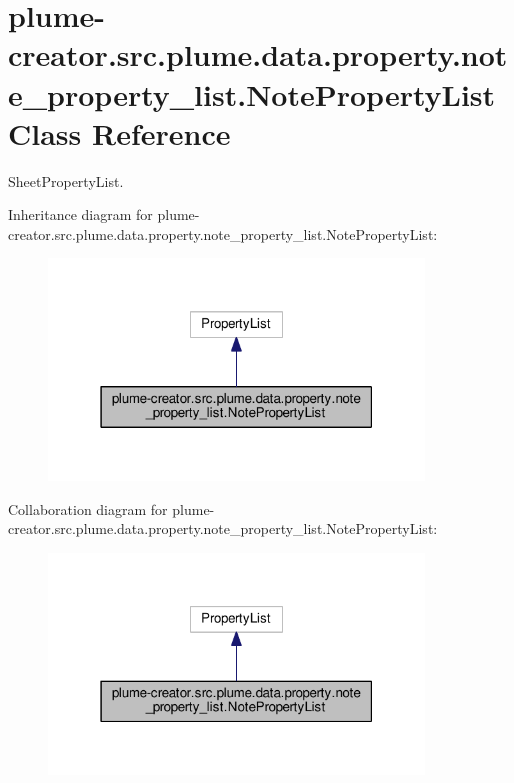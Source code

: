 \hypertarget{classplume-creator_1_1src_1_1plume_1_1data_1_1property_1_1note__property__list_1_1_note_property_list}{}\section{plume-\/creator.src.\+plume.\+data.\+property.\+note\+\_\+property\+\_\+list.\+Note\+Property\+List Class Reference}
\label{classplume-creator_1_1src_1_1plume_1_1data_1_1property_1_1note__property__list_1_1_note_property_list}


Sheet\+Property\+List.  




Inheritance diagram for plume-\/creator.src.\+plume.\+data.\+property.\+note\+\_\+property\+\_\+list.\+Note\+Property\+List\+:\nopagebreak
\begin{figure}[H]
\begin{center}
\leavevmode
\includegraphics[width=283pt]{classplume-creator_1_1src_1_1plume_1_1data_1_1property_1_1note__property__list_1_1_note_property_list__inherit__graph}
\end{center}
\end{figure}


Collaboration diagram for plume-\/creator.src.\+plume.\+data.\+property.\+note\+\_\+property\+\_\+list.\+Note\+Property\+List\+:\nopagebreak
\begin{figure}[H]
\begin{center}
\leavevmode
\includegraphics[width=283pt]{classplume-creator_1_1src_1_1plume_1_1data_1_1property_1_1note__property__list_1_1_note_property_list__coll__graph}
\end{center}
\end{figure}
